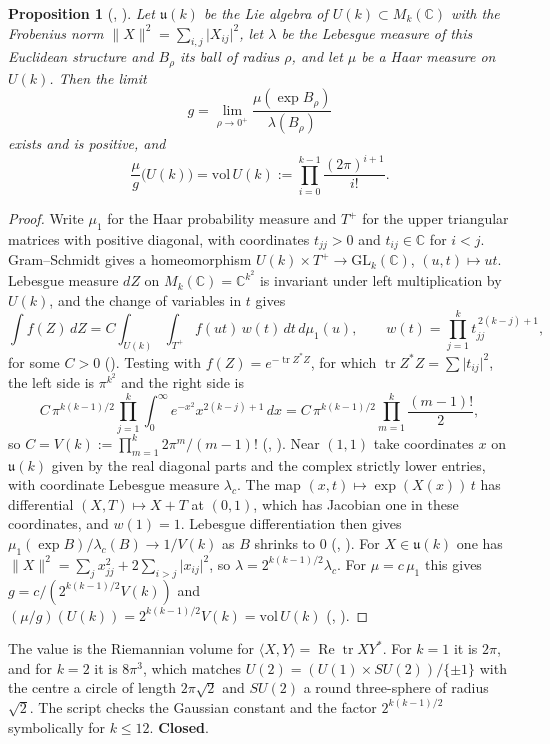 \documentclass[11pt]{article}
\newcommand{\sC}{\textbf{Closed}}
\newtheorem{proposition}[theorem]{Proposition}
\theoremstyle{remark}
\begin{document}
\begin{proposition}[, ]\label{prop:sl6a}
Let $\mathfrak u(k)$ be the Lie algebra of $U(k)\subset M_k(\mathbb C)$ with the Frobenius norm $\lVert X\rVert^2=\sum_{i,j}\lvert X_{ij}\rvert^2$, let $\lambda$ be the Lebesgue measure of this Euclidean structure and $B_\rho$ its ball of radius $\rho$, and let $\mu$ be a Haar measure on $U(k)$. Then the limit
\[
g=\lim_{\rho\to0^+}\frac{\mu(\exp B_\rho)}{\lambda(B_\rho)}
\]
exists and is positive, and
\[
\frac{\mu}{g}\bigl(U(k)\bigr)=\mathrm{vol}\,U(k):=\prod_{i=0}^{k-1}\frac{(2\pi)^{i+1}}{i!}.
\]
\end{proposition}

\begin{proof}
Write $\mu_1$ for the Haar probability measure and $T^+$ for the upper triangular matrices with positive diagonal, with coordinates $t_{jj}>0$ and $t_{ij}\in\mathbb C$ for $i<j$. Gram--Schmidt gives a homeomorphism $U(k)\times T^+\to\mathrm{GL}_k(\mathbb C)$, $(u,t)\mapsto ut$. Lebesgue measure $dZ$ on $M_k(\mathbb C)=\mathbb C^{k^2}$ is invariant under left multiplication by $U(k)$, and the change of variables in $t$ gives
\[
\int f(Z)\,dZ=C\int_{U(k)}\int_{T^+}f(ut)\,w(t)\,dt\,d\mu_1(u),\qquad w(t)=\prod_{j=1}^{k}t_{jj}^{\,2(k-j)+1},
\]
for some $C>0$ (). Testing with $f(Z)=e^{-\operatorname{tr}Z^*Z}$, for which $\operatorname{tr}Z^*Z=\sum\lvert t_{ij}\rvert^2$, the left side is $\pi^{k^2}$ and the right side is
\[
C\,\pi^{k(k-1)/2}\prod_{j=1}^{k}\int_0^\infty e^{-x^2}x^{2(k-j)+1}\,dx=C\,\pi^{k(k-1)/2}\prod_{m=1}^{k}\frac{(m-1)!}{2},
\]
so $C=V(k):=\prod_{m=1}^{k}2\pi^m/(m-1)!$ (, ). Near $(1,1)$ take coordinates $x$ on $\mathfrak u(k)$ given by the real diagonal parts and the complex strictly lower entries, with coordinate Lebesgue measure $\lambda_c$. The map $(x,t)\mapsto\exp(X(x))\,t$ has differential $(X,T)\mapsto X+T$ at $(0,1)$, which has Jacobian one in these coordinates, and $w(1)=1$. Lebesgue differentiation then gives $\mu_1(\exp B)/\lambda_c(B)\to1/V(k)$ as $B$ shrinks to $0$ (, ). For $X\in\mathfrak u(k)$ one has $\lVert X\rVert^2=\sum_jx_{jj}^2+2\sum_{i>j}\lvert x_{ij}\rvert^2$, so $\lambda=2^{k(k-1)/2}\lambda_c$. For $\mu=c\,\mu_1$ this gives $g=c/(2^{k(k-1)/2}V(k))$ and $(\mu/g)(U(k))=2^{k(k-1)/2}V(k)=\mathrm{vol}\,U(k)$ (, ).
\end{proof}

The value is the Riemannian volume for $\langle X,Y\rangle=\operatorname{Re}\operatorname{tr}XY^*$. For $k=1$ it is $2\pi$, and for $k=2$ it is $8\pi^3$, which matches $U(2)=(U(1)\times SU(2))/\{\pm1\}$ with the centre a circle of length $2\pi\sqrt2$ and $SU(2)$ a round three-sphere of radius $\sqrt2$. The script  checks the Gaussian constant and the factor $2^{k(k-1)/2}$ symbolically for $k\le12$. \sC.
\end{document}
